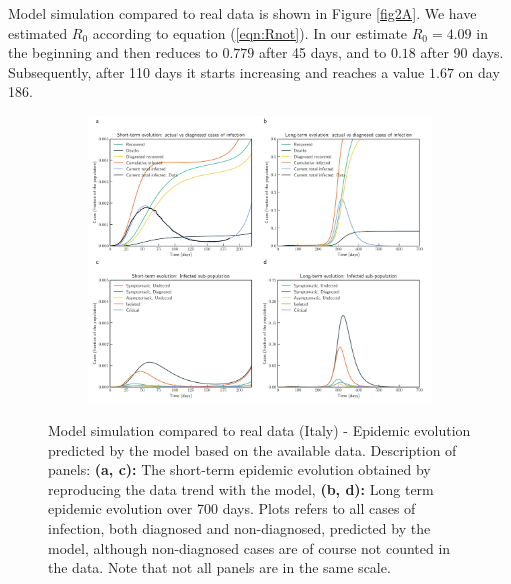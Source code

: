 \documentclass[authoryear,preprint]{elsarticle}
\begin{document}
Model simulation compared to real data is shown in Figure \ref{fig2A}. We have estimated $R_0$ according to equation (\ref*{eqn:Rnot}). In our estimate $R_0 = 4.09$ in the beginning and then reduces to $0.779$ after 45 days, and to $0.18$ after 90 days. Subsequently, after 110 days it starts increasing and reaches a value $1.67$ on day 186.
%
\begin{figure}[t!]
	\centering
	\begin{subfigure}[b]{\textwidth}
		\centering
		\includegraphics[width=\linewidth]{Italy_evolution.pdf}
	\end{subfigure}
	\caption{Model simulation compared to real data (Italy) - Epidemic evolution predicted by the model based on the available data. Description of panels: \textbf{(a, c):} The short-term epidemic evolution obtained by reproducing the data trend with the model, \textbf{(b, d):} Long term epidemic evolution over 700 days. Plots refers to all cases of infection, both diagnosed and non-diagnosed, predicted by the model, although non-diagnosed cases are of course not counted in the data. Note that not all panels are in the same scale.}
	\label{fig2B} 
\end{figure}
%
\end{document}

